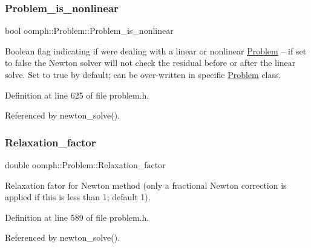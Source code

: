 \subsubsection{\texorpdfstring{Problem\+\_\+is\+\_\+nonlinear}{Problem\_is\_nonlinear}}
{\footnotesize\ttfamily bool oomph\+::\+Problem\+::\+Problem\+\_\+is\+\_\+nonlinear\hspace{0.3cm}{\ttfamily [protected]}}



Boolean flag indicating if we\textquotesingle{}re dealing with a linear or nonlinear \hyperlink{classoomph_1_1Problem}{Problem} -- if set to false the Newton solver will not check the residual before or after the linear solve. Set to true by default; can be over-\/written in specific \hyperlink{classoomph_1_1Problem}{Problem} class. 



Definition at line 625 of file problem.\+h.



Referenced by newton\+\_\+solve().

\mbox{\label{classoomph_1_1Problem_a86c4feb98ec982a08dc84fb664f53abc}} 
\subsubsection{\texorpdfstring{Relaxation\+\_\+factor}{Relaxation\_factor}}
{\footnotesize\ttfamily double oomph\+::\+Problem\+::\+Relaxation\+\_\+factor\hspace{0.3cm}{\ttfamily [protected]}}



Relaxation fator for Newton method (only a fractional Newton correction is applied if this is less than 1; default 1). 



Definition at line 589 of file problem.\+h.



Referenced by newton\+\_\+solve().

\mbox{\label{classoomph_1_1Problem_aeef791a0158657ca7c298ffcb63ed54e}} 
